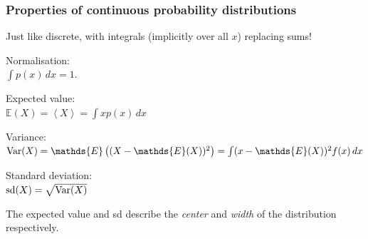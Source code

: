 \documentclass{beamer}
\begin{document}
\begin{frame}
\frametitle{Properties of continuous probability distributions}

Just like discrete, with integrals (implicitly over all $x$) replacing sums!

\pause
Normalisation:\\ $\int p(x) \, dx = 1$.\vspace{0.5em}

\pause
Expected value:\\$\mathds{E}(X) = \left<X\right> = \int x p(x) \, dx$\vspace{0.5em}

\pause
Variance:\\$\textnormal{Var}(X) = \mathds{E}\left((X - \mathds{E}(X))^2\right) = \int (x - \mathds{E}(X))^2 f(x) \, dx$\vspace{0.5em}

\pause
Standard deviation:\\$\textnormal{sd}(X) = \sqrt{\textnormal{Var}(X)}$

\pause
The expected value and sd describe the {\em center} and {\em width}
of the distribution respectively.

\end{frame}
\end{document}
